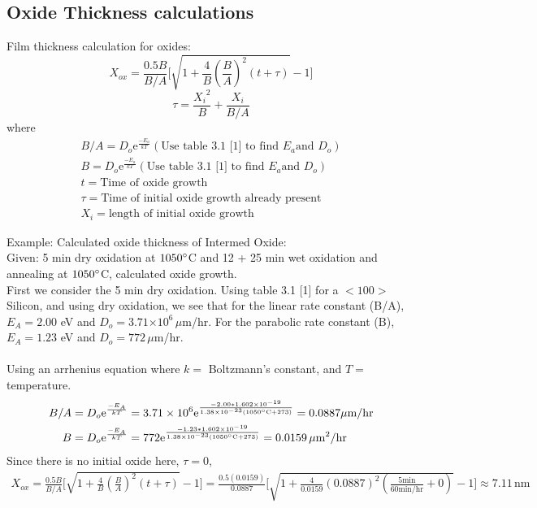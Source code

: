 \documentclass{article}
\newcommand{\me}{\mathrm{e}}
\providecommand{\e}[1]{\ensuremath{\times 10^{#1}}}
\begin{document}
\subsection{Oxide Thickness calculations}
\label{sec:oxide}
Film thickness calculation for oxides:
\begin{equation}
X_{ox} = \frac{0.5B}{B/A}\Big[\sqrt{1 + \frac{4}{B}(\frac{B}{A})^2(t + \tau)} - 1\Big]
\end{equation}
\begin{equation}
\tau = \frac{{X_i}^2}{B} + \frac{X_i}{B/A}
\end{equation}
where
\begin{align*}
B/A = D_o\me^{\frac{-E_a}{kT}} (\text{Use table 3.1 [1] to find }E_a \text{and } D_o) \\
B = D_o\me^{\frac{-E_a}{kT}} (\text{Use table 3.1 [1] to find }E_a \text{and } D_o) \\
t = \text{Time of oxide growth} \\ 
\tau = \text{Time of initial oxide growth already present} \\
X_i = \text{length of initial oxide growth}
\end{align*}

Example: Calculated oxide thickness of Intermed Oxide: \\
Given: 5 min dry oxidation at $1050\degree$C and 12 + 25 min wet oxidation and annealing at $1050\degree$C, calculated oxide growth. \\

First we consider the 5 min dry oxidation. Using table 3.1 [1] for a $<100>$ Silicon, and using dry oxidation, we see that for the linear rate constant (B/A), $E_A = 2.00$ eV and $D_o = 3.71\e{6} \, \mu$m/hr. For the parabolic rate constant (B), $E_A = 1.23$ eV and $D_o = 772\, \mu$m/hr. \\ \\
Using an arrhenius equation where $k =$ Boltzmann's constant, and $T = $ temperature. 
\begin{align*}
B/A &= D_o\me^{\frac{-E_A}{kT}} = 3.71\e{6}\me^{\frac{-2.00*1.602\e{-19}}{1.38\e{-23}(1050\degree\text{C} + 273)}} = 0.0887 \mu\text{m/hr} \\
B &= D_o\me^{\frac{-E_A}{kT}} = 772\me^{\frac{-1.23*1.602\e{-19}}{1.38\e{-23}(1050\degree\text{C} + 273)}} = 0.0159 \,{\mu\text{m}}^2\text{/hr}
\end{align*}
Since there is no initial oxide here, $\tau = 0$,
\begin{align*}
X_{ox} = \frac{0.5B}{B/A}\Big[\sqrt{1 + \frac{4}{B}(\frac{B}{A})^2(t + \tau)} - 1\Big] = \frac{0.5 (0.0159)}{0.0887}\Big[\sqrt{1 + \frac{4}{0.0159}(0.0887)^2(\frac{5\text{min}}{60\text{min/hr}} + 0)} - 1\Big] \approx 7.11 \, \text{nm}
\end{align*}
\end{document}

